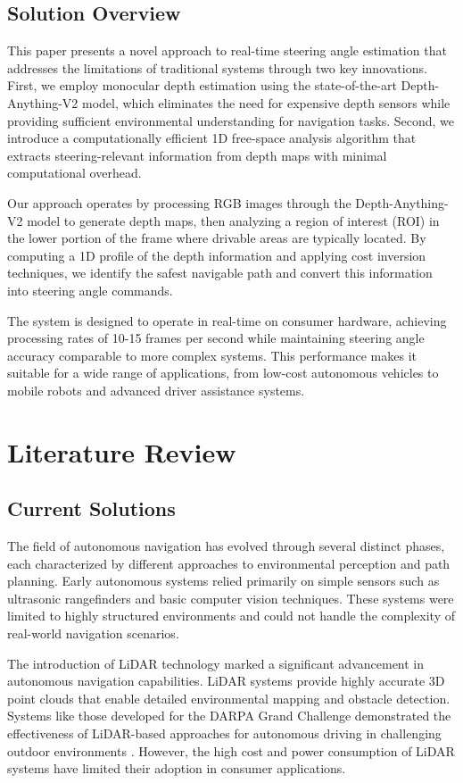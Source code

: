\documentclass[conference]{IEEEtran}
\begin{document}
\subsection{Solution Overview}
This paper presents a novel approach to real-time steering angle estimation that addresses the limitations of traditional systems through two key innovations. First, we employ monocular depth estimation using the state-of-the-art Depth-Anything-V2 model, which eliminates the need for expensive depth sensors while providing sufficient environmental understanding for navigation tasks. Second, we introduce a computationally efficient 1D free-space analysis algorithm that extracts steering-relevant information from depth maps with minimal computational overhead.

Our approach operates by processing RGB images through the Depth-Anything-V2 model to generate depth maps, then analyzing a region of interest (ROI) in the lower portion of the frame where drivable areas are typically located. By computing a 1D profile of the depth information and applying cost inversion techniques, we identify the safest navigable path and convert this information into steering angle commands.

The system is designed to operate in real-time on consumer hardware, achieving processing rates of 10-15 frames per second while maintaining steering angle accuracy comparable to more complex systems. This performance makes it suitable for a wide range of applications, from low-cost autonomous vehicles to mobile robots and advanced driver assistance systems.

\section{Literature Review}

\subsection{Current Solutions}
The field of autonomous navigation has evolved through several distinct phases, each characterized by different approaches to environmental perception and path planning. Early autonomous systems relied primarily on simple sensors such as ultrasonic rangefinders and basic computer vision techniques. These systems were limited to highly structured environments and could not handle the complexity of real-world navigation scenarios.

The introduction of LiDAR technology marked a significant advancement in autonomous navigation capabilities. LiDAR systems provide highly accurate 3D point clouds that enable detailed environmental mapping and obstacle detection. Systems like those developed for the DARPA Grand Challenge demonstrated the effectiveness of LiDAR-based approaches for autonomous driving in challenging outdoor environments \cite{b1}. However, the high cost and power consumption of LiDAR systems have limited their adoption in consumer applications.
\end{document}
